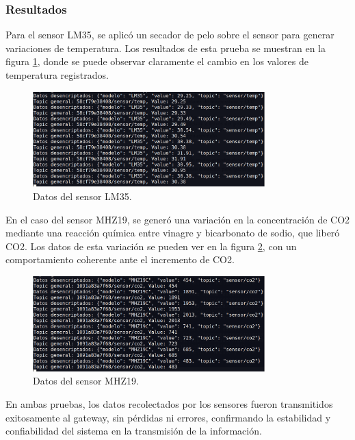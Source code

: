 \subsubsection{Resultados}

Para el sensor LM35, se aplicó un secador de pelo sobre el sensor para generar variaciones de temperatura. Los resultados de esta prueba se muestran en la figura \ref{fig:datos_lm35}, donde se puede observar claramente el cambio en los valores de temperatura registrados.

\begin{figure}[H]
\centering 
\includegraphics[width=0.8\textwidth]{./Figures/datos_lm35.png}
\caption{Datos del sensor LM35.}
\label{fig:datos_lm35}
\end{figure}

En el caso del sensor MHZ19, se generó una variación en la concentración de CO2 mediante una reacción química entre vinagre y bicarbonato de sodio, que liberó CO2. Los datos de esta variación se pueden ver en la figura \ref{fig:datos_mhz19}, con un comportamiento coherente ante el incremento de CO2.

\begin{figure}[H]
\centering 
\includegraphics[width=0.8\textwidth]{./Figures/datos_mhz19.png}
\caption{Datos del sensor MHZ19.}
\label{fig:datos_mhz19}
\end{figure}

En ambas pruebas, los datos recolectados por los sensores fueron transmitidos exitosamente al gateway, sin pérdidas ni errores, confirmando la estabilidad y confiabilidad del sistema en la transmisión de la información.


